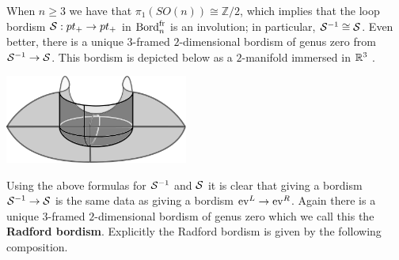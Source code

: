 \documentclass{amsart}
\begin{document}
When $n\geq 3$ we have that $\pi_1(SO(n)) \cong \mathbb{Z}/2$, which implies that the loop bordism $\mathcal S: pt_+ \rightarrow pt_+$ in $\mathrm{Bord}^\mathrm{fr}_n$ is an involution; in particular, $\mathcal S^{-1} \cong \mathcal S$.
Even better, there is a unique $3$-framed $2$-dimensional bordism of genus zero from $\mathcal S^{-1} \rightarrow \mathcal S$. This bordism is depicted below as a $2$-manifold immersed in $\mathbb R^3$ . %
\begin{center}
\includegraphics[width=60mm]{cobordism.png}
\end{center}


Using the above formulas for $\mathcal S^{-1}$ and $\mathcal S$ it is clear that giving a bordism $\mathcal S^{-1} \rightarrow \mathcal S$ is the same data as giving a bordism $\mathrm{ev}^L \rightarrow \mathrm{ev}^R$.  Again there is a unique $3$-framed $2$-dimensional bordism of genus zero which we call this the {\bfseries Radford bordism}.  Explicitly the Radford bordism is given by the following composition.
\end{document}
